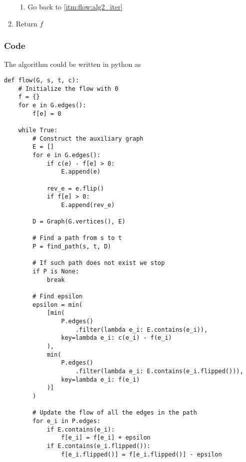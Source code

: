 \documentclass[12pt]{extarticle}
\begin{document}
\begin{enumerate}
\begin{enumerate}[label*=\arabic*.]
              \item Go back to \autoref{itm:flow:alg2_iter}
          \end{enumerate}
    \item \label{itm:flow:alg2_return} Return $f$
\end{enumerate}

\subsubsection{Code}

The algorithm could be written in python as
\begin{verbatim}
def flow(G, s, t, c):
    # Initialize the flow with 0
    f = {}
    for e in G.edges():
        f[e] = 0

    while True:
        # Construct the auxiliary graph
        E = []
        for e in G.edges():
            if c(e) - f[e] > 0:
                E.append(e)
            
            rev_e = e.flip()
            if f[e] > 0:
                E.append(rev_e)

        D = Graph(G.vertices(), E)

        # Find a path from s to t
        P = find_path(s, t, D)

        # If such path does not exist we stop
        if P is None:
            break

        # Find epsilon
        epsilon = min(
            [min(
                P.edges()
                    .filter(lambda e_i: E.contains(e_i)),
                key=lambda e_i: c(e_i) - f(e_i)
            ),
            min(
                P.edges()
                    .filter(lambda e_i: E.contains(e_i.flipped())),
                key=lambda e_i: f(e_i)
            )]
        )

        # Update the flow of all the edges in the path
        for e_i in P.edges:
            if E.contains(e_i):
                f[e_i] = f[e_i] + epsilon
            if E.contains(e_i.flipped()):
                f[e_i.flipped()] = f[e_i.flipped()] - epsilon
\end{verbatim}
\end{document}
